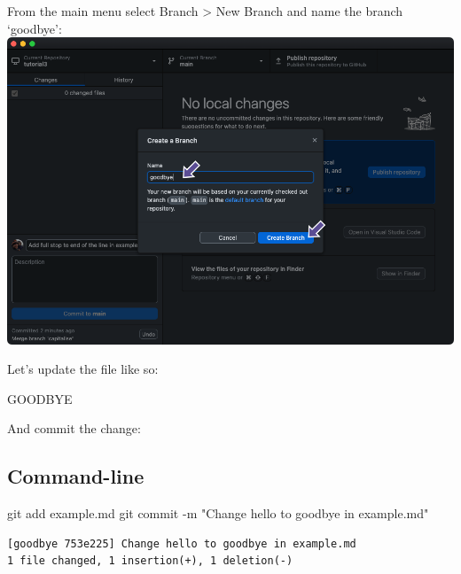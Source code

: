 \documentclass[
  letterpaper,
  DIV=11,
  numbers=noendperiod]{scrartcl}
\newenvironment{Shaded}{\begin{snugshade}}{\end{snugshade}}
\newcommand{\NormalTok}[1]{\textcolor[rgb]{0.00,0.23,0.31}{#1}}
\newcommand{\SpecialCharTok}[1]{\textcolor[rgb]{0.37,0.37,0.37}{#1}}
\newcommand{\StringTok}[1]{\textcolor[rgb]{0.13,0.47,0.30}{#1}}
\begin{document}
From the main menu select Branch \textgreater{} New Branch and name the
branch `goodbye': \includegraphics{images/image58.png}

Let's update the file like so:

\begin{tcolorbox}[enhanced jigsaw, opacityback=0, colframe=quarto-callout-note-color-frame, toprule=.15mm, arc=.35mm, rightrule=.15mm, title=\textcolor{quarto-callout-note-color}{\faInfo}\hspace{0.5em}{example.md}, colbacktitle=quarto-callout-note-color!10!white, left=2mm, leftrule=.75mm, opacitybacktitle=0.6, toptitle=1mm, colback=white, bottomtitle=1mm, breakable, titlerule=0mm, bottomrule=.15mm, coltitle=black]

GOODBYE

\end{tcolorbox}

And commit the change:

\subsection{Command-line}

\begin{Shaded}
\begin{Highlighting}[]
\NormalTok{git add example.md}
\NormalTok{git commit }\SpecialCharTok{{-}}\NormalTok{m }\StringTok{"Change hello to goodbye in example.md"}
\end{Highlighting}
\end{Shaded}

\begin{verbatim}
[goodbye 753e225] Change hello to goodbye in example.md
1 file changed, 1 insertion(+), 1 deletion(-)
\end{verbatim}
\end{document}
